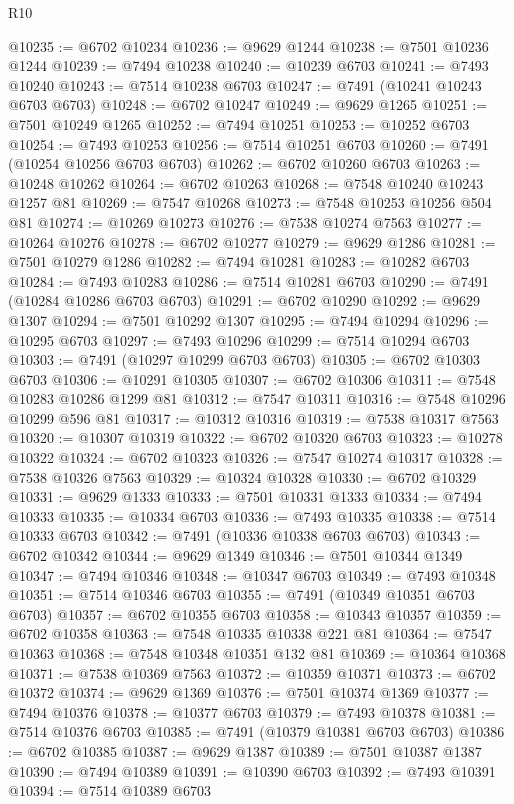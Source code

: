 \begin{lexlean}{R10}
\begin{coremodule}
@10235 := @6702 @10234
@10236 := @9629 @1244
@10238 := @7501 @10236 @1244
@10239 := @7494 @10238
@10240 := @10239 @6703
@10241 := @7493 @10240
@10243 := @7514 @10238 @6703
@10247 := @7491 (@10241 @10243 @6703 @6703)
@10248 := @6702 @10247
@10249 := @9629 @1265
@10251 := @7501 @10249 @1265
@10252 := @7494 @10251
@10253 := @10252 @6703
@10254 := @7493 @10253
@10256 := @7514 @10251 @6703
@10260 := @7491 (@10254 @10256 @6703 @6703)
@10262 := @6702 @10260 @6703
@10263 := @10248 @10262
@10264 := @6702 @10263
@10268 := @7548 @10240 @10243 @1257 @81
@10269 := @7547 @10268
@10273 := @7548 @10253 @10256 @504 @81
@10274 := @10269 @10273
@10276 := @7538 @10274 @7563
@10277 := @10264 @10276
@10278 := @6702 @10277
@10279 := @9629 @1286
@10281 := @7501 @10279 @1286
@10282 := @7494 @10281
@10283 := @10282 @6703
@10284 := @7493 @10283
@10286 := @7514 @10281 @6703
@10290 := @7491 (@10284 @10286 @6703 @6703)
@10291 := @6702 @10290
@10292 := @9629 @1307
@10294 := @7501 @10292 @1307
@10295 := @7494 @10294
@10296 := @10295 @6703
@10297 := @7493 @10296
@10299 := @7514 @10294 @6703
@10303 := @7491 (@10297 @10299 @6703 @6703)
@10305 := @6702 @10303 @6703
@10306 := @10291 @10305
@10307 := @6702 @10306
@10311 := @7548 @10283 @10286 @1299 @81
@10312 := @7547 @10311
@10316 := @7548 @10296 @10299 @596 @81
@10317 := @10312 @10316
@10319 := @7538 @10317 @7563
@10320 := @10307 @10319
@10322 := @6702 @10320 @6703
@10323 := @10278 @10322
@10324 := @6702 @10323
@10326 := @7547 @10274 @10317
@10328 := @7538 @10326 @7563
@10329 := @10324 @10328
@10330 := @6702 @10329
@10331 := @9629 @1333
@10333 := @7501 @10331 @1333
@10334 := @7494 @10333
@10335 := @10334 @6703
@10336 := @7493 @10335
@10338 := @7514 @10333 @6703
@10342 := @7491 (@10336 @10338 @6703 @6703)
@10343 := @6702 @10342
@10344 := @9629 @1349
@10346 := @7501 @10344 @1349
@10347 := @7494 @10346
@10348 := @10347 @6703
@10349 := @7493 @10348
@10351 := @7514 @10346 @6703
@10355 := @7491 (@10349 @10351 @6703 @6703)
@10357 := @6702 @10355 @6703
@10358 := @10343 @10357
@10359 := @6702 @10358
@10363 := @7548 @10335 @10338 @221 @81
@10364 := @7547 @10363
@10368 := @7548 @10348 @10351 @132 @81
@10369 := @10364 @10368
@10371 := @7538 @10369 @7563
@10372 := @10359 @10371
@10373 := @6702 @10372
@10374 := @9629 @1369
@10376 := @7501 @10374 @1369
@10377 := @7494 @10376
@10378 := @10377 @6703
@10379 := @7493 @10378
@10381 := @7514 @10376 @6703
@10385 := @7491 (@10379 @10381 @6703 @6703)
@10386 := @6702 @10385
@10387 := @9629 @1387
@10389 := @7501 @10387 @1387
@10390 := @7494 @10389
@10391 := @10390 @6703
@10392 := @7493 @10391
@10394 := @7514 @10389 @6703

\end{coremodule}
\end{lexlean}

